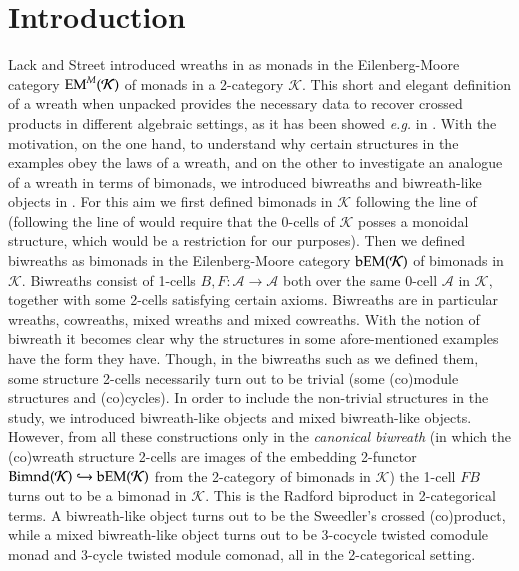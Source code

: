 \documentclass[a4paper, 12pt]{article}
\renewcommand{\_}[1]{\mbox{$_{\left( #1 \right)}$}}
\theoremstyle{plain}
\newcommand{\bEM}{{\rm bEM}}
\newcommand{\EM}{{\rm EM}}
\newcommand{\Bimnd}{{\rm Bimnd}}
\newcommand{\A}{{\mathcal A}}
\def\K{{\mathcal K}}  %
\begin{document}
\section{Introduction}


Lack and Street introduced wreaths in \cite{LS} as monads in the Eilenberg-Moore category $\EM^M(\K)$ of monads in a 2-category $\K$. 
This short and elegant definition of a wreath %
when unpacked provides the necessary 
data to recover crossed products in different algebraic settings, as it has been showed {\em e.g.} in \cite{LS, BC}.  With the motivation, on the one hand, to understand why 
certain structures in the examples obey the laws of a wreath, and on the other to investigate an analogue of a wreath in terms of bimonads, %
we introduced biwreaths and biwreath-like objects in \cite{Femic5}. For this aim we first defined bimonads in $\K$ following the line of \cite{Wisb} %
(following the line of \cite{McC, Moe}  %
would require that the 0-cells of $\K$ posses a monoidal structure, which would be a restriction for our purposes). Then we defined biwreaths as bimonads in the 
Eilenberg-Moore category $\bEM(\K)$ of bimonads in $\K$. Biwreaths consist of 1-cells $B,F:\A\to\A$ both over the same 0-cell $\A$ in $\K$, together with some 2-cells 
satisfying certain axioms. Biwreaths are in particular wreaths, cowreaths, mixed wreaths and mixed cowreaths. 
With the notion of biwreath it becomes clear why the structures in some afore-mentioned  examples have the form they have. 
Though, in the biwreaths such as we defined them, 
some structure 2-cells necessarily turn out to be trivial (some (co)module structures and (co)cycles). 
In order to include the non-trivial structures in the study, we introduced biwreath-like objects and mixed biwreath-like objects. %
However, from all these constructions only in the {\em canonical biwreath} 
(in which the (co)wreath structure 2-cells are images of the embedding 2-functor $\Bimnd(\K)\hookrightarrow\bEM(\K)$ from the 2-category of bimonads in $\K$) 
the 1-cell $FB$ turns out to be a bimonad in $\K$. This is the Radford biproduct in 2-categorical terms. A biwreath-like object turns out to be the Sweedler's crossed (co)product, 
while a mixed biwreath-like object turns out to be 3-cocycle twisted comodule monad and 3-cycle twisted module comonad, all in the 2-categorical setting. 
\end{document}
